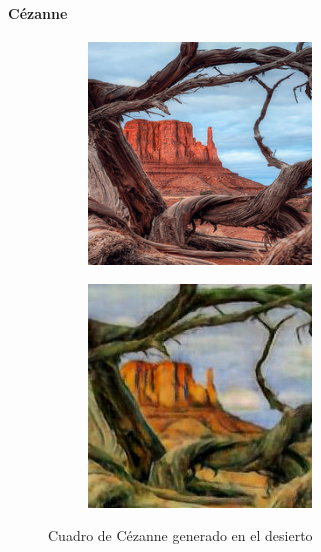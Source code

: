 \documentclass[[../main.tex]{subfiles}
\begin{document}
    \paragraph{Cézanne}
        \begin{figure}[!htb]
            \begin{subfigure}[b]{0.49\textwidth}
            \includegraphics[width=0.65\textwidth]{imagenes/imagen2cuadro/dataset/cezanne/2014-08-06 08_56_57.jpg}
            \end{subfigure}
        \hfill
            \begin{subfigure}[b]{0.49\textwidth}
            \includegraphics[width=0.65\textwidth]{imagenes/imagen2cuadro/dataset/cezanne/2014-08-06 08_56_57_2.jpg}
            \end{subfigure}
        \caption{Cuadro de Cézanne generado en el desierto}
        \label{fig:cezanne_cuadro_dataset_desierto}
        \end{figure}
        
\end{document}
